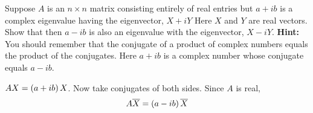\begin{enumialphparenastyle}
\begin{ex} Suppose $A$ is an $n\times n$ matrix consisting entirely of real
entries but $a+ib$ is a complex eigenvalue having the eigenvector, $X+iY$ Here $X$ and $Y$ are real vectors. Show
that then $a-ib$ is also an eigenvalue with the eigenvector, $X-iY$. \textbf{Hint: }You should remember that the conjugate of a
product of complex numbers equals the product of the conjugates. Here $a+ib$
is a complex number whose conjugate equals $a-ib$. 
\begin{sol}
 $AX=\left(
a+ib\right)X$. Now take conjugates of both sides. Since $A$ is
real,
\[
A\overline{X}=\left(a-ib\right) \overline{X}
\]
\end{sol}
\end{ex}

\end{enumialphparenastyle}